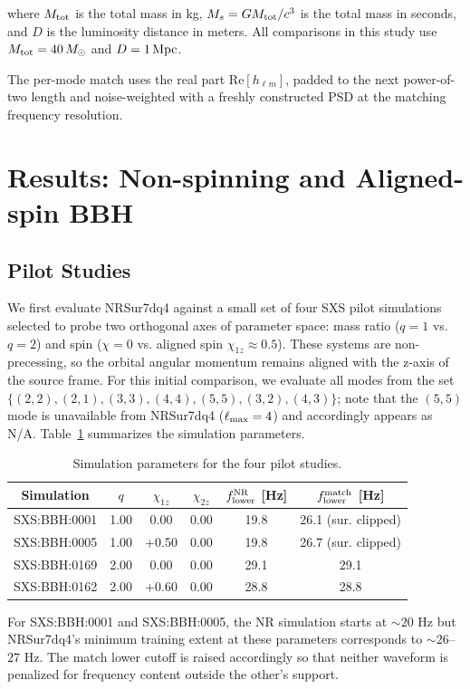 \documentclass[%
 reprint,
superscriptaddress,
 amsmath,amssymb,
 aps,
]{revtex4-2}
\begin{document}
where $M_{\rm tot}$ is the total mass in kg, $M_s = G M_{\rm tot} / c^3$ is the total mass in seconds, and $D$ is the luminosity distance in meters. All comparisons in this study use $M_{\rm tot} = 40\,M_\odot$ and $D = 1\,{\rm Mpc}$.

The per-mode match uses the real part $\mathrm{Re}[h_{\ell m}]$, padded to the next power-of-two length and noise-weighted with a freshly constructed PSD at the matching frequency resolution.


\section{Results: Non-spinning and Aligned-spin BBH}

\subsection{Pilot Studies}
We first evaluate NRSur7dq4 against a small set of four SXS pilot simulations selected to probe two orthogonal axes of parameter space: mass ratio ($q = 1$ vs. $q = 2$) and spin ($\chi = 0$ vs. aligned spin $\chi_{1z} \approx 0.5$). These systems are non-precessing, so the orbital angular momentum remains aligned with the z-axis of the source frame. For this initial comparison, we evaluate all modes from the set $\{(2,2), (2,1), (3,3), (4,4), (5,5), (3,2), (4,3)\}$; note that the $(5,5)$ mode is unavailable from NRSur7dq4 ($\ell_{\rm max}=4$) and accordingly appears as N/A. Table~\ref{tab:pilot_params} summarizes the simulation parameters.

\begin{table}[t]
\centering
\caption{Simulation parameters for the four pilot studies.}
\label{tab:pilot_params}
\begin{tabular}{cccccc}
\toprule
Simulation & $q$ & $\chi_{1z}$ & $\chi_{2z}$ & $f_{\rm lower}^{\rm NR}$ [Hz] & $f_{\rm lower}^{\rm match}$ [Hz] \\
\midrule
SXS:BBH:0001 & 1.00 & 0.00 & 0.00 & 19.8 & 26.1 (sur. clipped) \\
SXS:BBH:0005 & 1.00 & +0.50 & 0.00 & 19.8 & 26.7 (sur. clipped) \\
SXS:BBH:0169 & 2.00 & 0.00 & 0.00 & 29.1 & 29.1 \\
SXS:BBH:0162 & 2.00 & +0.60 & 0.00 & 28.8 & 28.8 \\
\bottomrule
\end{tabular}
\end{table}
For SXS:BBH:0001 and SXS:BBH:0005, the NR simulation starts at $\sim 20$ Hz but NRSur7dq4's minimum training extent at these parameters corresponds to $\sim 26$–$27$ Hz. The match lower cutoff is raised accordingly so that neither waveform is penalized for frequency content outside the other's support.
\end{document}
